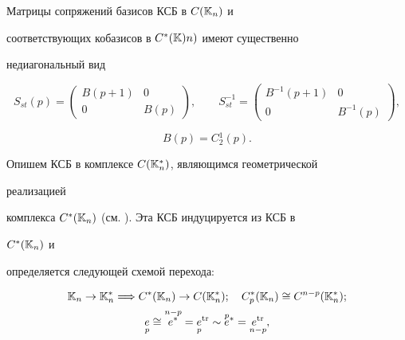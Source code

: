 \begin{note} Матрицы сопряжений базисов КСБ в $C(\Bbb K_n)$ и 


соответствующих кобазисов в $C^*(\Bbb K)n)$ имеют существенно 


недиагональный вид 


\begin{equation} 


S_{st}(p)= 


\begin{pmatrix} 


B(p+1) &0\\ 


0& B(p) 


\end{pmatrix}, 


\qquad 


S_{st}^{-1}= 


\begin{pmatrix} 


B^{-1}(p+1) & 0\\ 


0 & B^{-1}(p) 


\end{pmatrix}, 


\end{equation} 


$$ 


B(p)=C{}^1_2(p). 


$$ 


 


Опишем КСБ в комплексе $C(\Bbb K_n^*)$, являющимся геометрической 


реализацией 


комплекса $C^*(\Bbb K_n)$ (см. \cite{Yak1}). Эта КСБ индуцируется из КСБ в 


$C^*(\Bbb K_n)$ и 


определяется следующей схемой перехода: 


\begin{gather*} 


\Bbb K_n\to \Bbb K_n^*\Longrightarrow C^*(\Bbb K_n)\to 


C(\Bbb K_n^*);\quad 


C^*_p(\Bbb K_n)\cong C^{n-p}(\Bbb K_n^*);\\ 


\down{p}{e}\cong\up{n-p}{e^*}=\down{p}{e}^{\tr} 


\sim\up{p}{e}^*=\down{n-p}{e^{\tr}},\\ 



\end{gather*}
\end{note}

